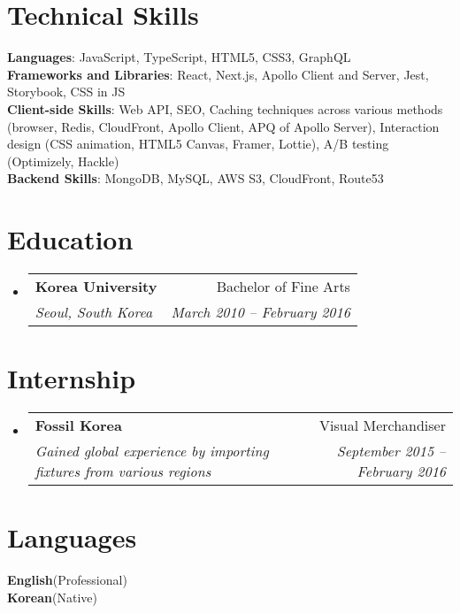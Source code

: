 \documentclass[letterpaper,10pt]{article}
\makeatletter
\newcommand{\resumeSubheading}[4]{
  \item
    \begin{tabular*}{0.97\textwidth}[t]{l@{\extracolsep{\fill}}r}
      \textbf{#1} & #2 \\
      \textit{\small#3} & \textit{\small #4} \\
    \end{tabular*}\vspace{-7pt}
}
\newcommand{\resumeSubHeadingListStart}{\begin{itemize}[leftmargin=0.1in, label={}]}
\newcommand{\resumeSubHeadingListEnd}{\end{itemize}\vspace{2pt}}
\makeatother
\begin{document}
\section{Technical Skills}
 \begin{itemize}[leftmargin=0.1in, label={}]
    \small{\item{
     \textbf{Languages}{: JavaScript, TypeScript, HTML5, CSS3, GraphQL} \\
     \textbf{Frameworks and Libraries}{: React, Next.js, Apollo Client and Server, Jest, Storybook, CSS in JS
} \\
     \textbf{Client-side Skills}{: Web API, SEO, Caching techniques across various methods (browser, Redis, CloudFront, Apollo Client, APQ of Apollo Server), Interaction design (CSS animation, HTML5 Canvas, Framer, Lottie), A/B testing (Optimizely, Hackle)
} \\
     \textbf{Backend Skills}{: MongoDB, MySQL, AWS S3, CloudFront, Route53}
    }}
 \end{itemize}
 
\section{Education}
    \resumeSubHeadingListStart
        \resumeSubheading
          {Korea University}{Bachelor of Fine Arts}
          {Seoul, South Korea}{March 2010 -- February 2016}
        \resumeSubHeadingListEnd
        

\section{Internship}
    \resumeSubHeadingListStart
        \resumeSubheading
          {Fossil Korea}{Visual Merchandiser}
          {Gained global experience by importing fixtures from various regions}{September 2015 -- February 2016}
        \resumeSubHeadingListEnd

\section{Languages}
 \begin{itemize}[leftmargin=0.1in, label={}]
    \small{\item{
     \textbf{English}{(Professional)}\\
     \textbf{Korean}{(Native)}
    }}
 \end{itemize}

\end{document}
